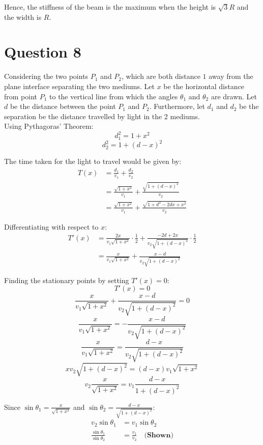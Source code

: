 \documentclass[11pt]{article}
\begin{document}
Hence, the stiffness of the beam is the maximum when the height is \(\sqrt{3}R\) and the width is \(R\).

\newpage

\section{Question 8}
\label{sec:org589f1d1}

Considering the two points \(P_1\) and \(P_2\), which are both distance \(1\) away from the plane interface separating the two mediums. Let \(x\) be the horizontal distance from point \(P_1\) to the vertical line from which the angles \(\theta_1\) and \(\theta_2\) are drawn. Let \(d\) be the distance between the point \(P_1\) and \(P_2\). Furthermore, let \(d_1\) and \(d_2\) be the separation be the distance travelled by light in the 2 mediums.
\\[0pt]

Using Pythagoras' Theorem:
\[d_1^2 = 1 + x^2\]
\[d_2^2 = 1 + (d - x)^2\]

The time taken for the light to travel would be given by:
\begin{align*}
T(x) &= \frac{d_1}{v_1} + \frac{d_2}{v_2} \\
&= \frac{\sqrt{1 + x^2}}{v_1} + \frac{\sqrt{1 + (d - x)^2}}{v_2} \\
&= \frac{\sqrt{1 + x^2}}{v_1} + \frac{\sqrt{1 + d^2 - 2dx + x^2}}{v_2}
\end{align*}

Differentiating with respect to \(x\):
\begin{align*}
T'(x) &= \frac{2x}{v_1\sqrt{1 + x^2}} \cdot \frac{1}{2} + \frac{-2d + 2x}{v_2\sqrt{1 + (d - x)^2}} \cdot \frac{1}{2} \\
&= \frac{x}{v_1 \sqrt{1 + x^2}} + \frac{x - d}{v_2\sqrt{1 + (d - x)^2}}
\end{align*}

\newpage

Finding the stationary points by setting \(T'(x) = 0\):
\[T'(x) = 0\]
\[\frac{x}{v_1 \sqrt{1 + x^2}} + \frac{x - d}{v_2\sqrt{1 + (d - x)^2}} = 0\]
\[\frac{x}{v_1 \sqrt{1 + x^2}} = -\frac{x - d}{v_2\sqrt{1 + (d - x)^2}}\]
\[\frac{x}{v_1 \sqrt{1 + x^2}} = \frac{d - x}{v_2\sqrt{1 + (d - x)^2}}\]
\[xv_2\sqrt{1 + (d - x)^2} = (d - x)v_1\sqrt{1 + x^2}\]
\[v_2\frac{x}{\sqrt{1 + x^2}} = v_1\frac{d - x}{1 + (d - x)^2}\]

Since \(\sin \theta_1 = \frac{x}{\sqrt{1 + x^2}}\) and \(\sin \theta_2 = \frac{d - x}{\sqrt{1 + (d - x)^2}}\):
\begin{align*}
v_2 \sin \theta_1 &= v_1 \sin \theta_2 \\
\frac{\sin \theta_1}{\sin \theta_2} &= \frac{v_1}{v_2} \quad \textbf{(Shown)}
\end{align*}
\end{document}

